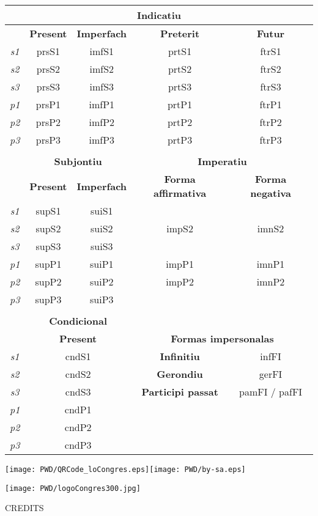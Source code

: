 \documentclass[10pt,a4paper,final]{article}
\begin{document}
\begin{tabular}{|c|c|c|c|c|}
\hline 
\multicolumn{5}{|c|}{\textbf{Indicatiu}} \\ 
\hline 
 & \textbf{Present} & \textbf{Imperfach} & \textbf{Preterit} & \textbf{Futur} \\ 
\hline 
\textit{s1} & prsS1 & imfS1 & prtS1 & ftrS1 \\ 
\hline 
\textit{s2} & prsS2 & imfS2 & prtS2 & ftrS2 \\ 
\hline 
\textit{s3} & prsS3 & imfS3 & prtS3 & ftrS3 \\ 
\hline 
\textit{p1} & prsP1 & imfP1 & prtP1 & ftrP1 \\ 
\hline 
\textit{p2} & prsP2 & imfP2 & prtP2 & ftrP2 \\ 
\hline 
\textit{p3} & prsP3 & imfP3 & prtP3 & ftrP3 \\ 
\hline 
\multicolumn{5}{|c|}{} \\ 
\hline 
 & \multicolumn{2}{c|}{\textbf{Subjontiu}}  & \multicolumn{2}{c|}{\textbf{Imperatiu}} \\ 
\hline 
 & \textbf{Present} & \textbf{Imperfach} & \textbf{Forma affirmativa} & \textbf{Forma negativa} \\ 
\hline 
\textit{s1} & supS1 & suiS1 & \multicolumn{2}{c|}{} \\ 
\hline 
\textit{s2} & supS2 & suiS2 & impS2 & imnS2 \\ 
\hline 
\textit{s3} & supS3 & suiS3 & \multicolumn{2}{c|}{} \\ 
\hline 
\textit{p1} & supP1 & suiP1 & impP1 & imnP1 \\ 
\hline 
\textit{p2} & supP2 & suiP2 & impP2 & imnP2 \\ 
\hline 
\textit{p3} & supP3 & suiP3 & \multicolumn{2}{c|}{} \\ 
\hline 
\multicolumn{5}{|c|}{} \\ 
\hline 
 & \multicolumn{2}{c|}{\textbf{Condicional}} & \multicolumn{2}{c|}{} \\ 
\hline 
 &  \multicolumn{2}{c|}{\textbf{Present}} & \multicolumn{2}{c|}{\textbf{Formas impersonalas}}  \\ 
\hline 
\textit{s1} & \multicolumn{2}{c|}{cndS1}  & \textbf{Infinitiu} & infFI \\ 
\hline 
\textit{s2} & \multicolumn{2}{c|}{cndS2}  & \textbf{Gerondiu} & gerFI \\ 
\hline 
\textit{s3} & \multicolumn{2}{c|}{cndS3}  & \textbf{Participi passat} & pamFI / pafFI \\ 
\hline 
\textit{p1} & \multicolumn{2}{c|}{cndP1} & \multicolumn{2}{c|}{} \\ 
\hline 
\textit{p2} & \multicolumn{2}{c|}{cndP2} & \multicolumn{2}{c|}{} \\ 
\hline 
\textit{p3} & \multicolumn{2}{c|}{cndP3} & \multicolumn{2}{c|}{} \\ 
\hline 
\end{tabular}

\texttt{[image: PWD/QRCode\_loCongres.eps]}\hfill\texttt{[image: PWD/by-sa.eps]}

\begin{center}
\texttt{[image: PWD/logoCongres300.jpg]}
\end{center}

\footnotesize{CREDITS}
\end{document}
